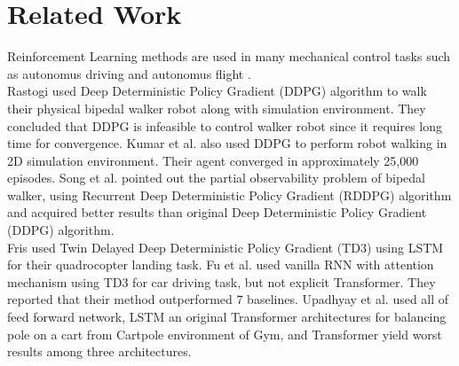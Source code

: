 \section{Related Work}
\label{sec:relatedwork}
Reinforcement Learning methods are used in many mechanical control tasks such as autonomus driving  \cite{pan_virtual_2017} \cite{shalev-shwartz_safe_2016} \cite{sallab_deep_2017} \cite{wang_deep_2019} and autonomus flight   \cite{kopsa_reinforcement_2018} \cite{abbeel_application_2006} \cite{santos_experimental_2012}. \\
Rastogi \cite{rastogi_deep_2017} used Deep Deterministic Policy Gradient (DDPG) algorithm to walk their physical bipedal walker robot along with simulation environment. They concluded that DDPG is infeasible to control walker robot since it requires long time for convergence. Kumar et al. \cite{kumar_bipedal_2018} also used DDPG to perform robot walking in 2D simulation environment. Their agent converged in approximately 25,000 episodes. Song et al. \cite{song_recurrent_2018} pointed out the partial observability problem of bipedal walker, using Recurrent Deep Deterministic Policy Gradient (RDDPG) \cite{heess_memory-based_2015} algorithm and acquired better results than original Deep Deterministic Policy Gradient (DDPG) algorithm. \\
Fris \cite{fris_landing_2020} used Twin Delayed Deep Deterministic Policy Gradient (TD3) using LSTM for their quadrocopter landing task. Fu et al. \cite{fu_when_2020} used vanilla RNN with attention mechanism using TD3 for car driving task, but not explicit Transformer. They reported that their method outperformed 7 baselines. Upadhyay et al. \cite{upadhyay_transformer_2019} used all of feed forward network, LSTM an original Transformer architectures for balancing pole on a cart from Cartpole environment of Gym, and Transformer yield worst results among three architectures.